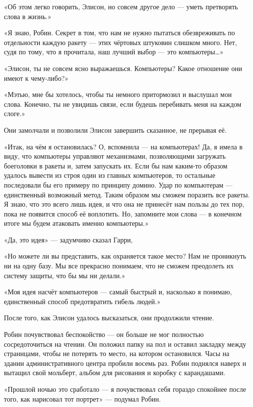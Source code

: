 \documentclass[a5paper, 9pt,
final, openany, twoside=true]{memoir}
\begin{document}
«Об этом легко говорить, Элисон, но совсем другое дело — уметь претворять слова в жизнь.»

«Я знаю, Робин. Секрет в том, что нам не нужно пытаться обезвреживать по отдельности каждую ракету — этих чёртовых штуковин слишком много. Нет, судя по тому, что я прочитала, наш лучший выбор — это компьютеры…»

«Элисон, ты не совсем ясно выражаешься. Компьютеры? Какое отношение они имеют к чему-либо?»

«Мэтью, мне бы хотелось, чтобы ты немного притормозил и выслушал мои слова. Конечно, ты не увидишь связи, если будешь перебивать меня на каждом слоге.»

Они замолчали и позволили Элисон завершить сказанное, не прерывая её.

«Итак, на чём я остановилась? О, вспомнила — на компьютерах! Да, я имела в виду, что компьютеры управляют механизмами, позволяющими загружать боеголовки в ракеты и, затем запускать их. Если бы нам каким-то образом удалось вывести из строя один из главных компьютеров, то остальные последовали бы его примеру по принципу домино. Удар по компьютерам — единственный возможный метод. Таким образом мы сможем поразить все ракеты. Я знаю, что это всего лишь идея, и что она не принесёт нам пользы до тех пор, пока не появится способ её воплотить. Но, запомните мои слова — в конечном итоге мы будем атаковать именно компьютеры.»

«Да, это идея» — задумчиво сказал Гарри,

«Но можете ли вы представить, как охраняется такое место? Нам не проникнуть ни на одну базу. Мы все прекрасно понимаем, что не сможем преодолеть их систему защиты, что бы мы ни делали.»

«Моя идея насчёт компьютеров — самый быстрый и, насколько я понимаю, единственный способ предотвратить гибель людей.»

После того, как Элисон удалось высказаться, они продолжили чтение.

Робин почувствовал беспокойство — он больше не мог полностью сосредоточиться на чтении. Он положил папку на пол и оставил закладку между страницами, чтобы не потерять то место, на котором остановился. Часы на здании административного центра пробили восемь раз. Робин поднялся наверх и вытащил свой мольберт, альбом для рисования и коробку с карандашами.

«Прошлой ночью это сработало — я почувствовал себя гораздо спокойнее после того, как нарисовал тот портрет» — подумал Робин.
\end{document}
